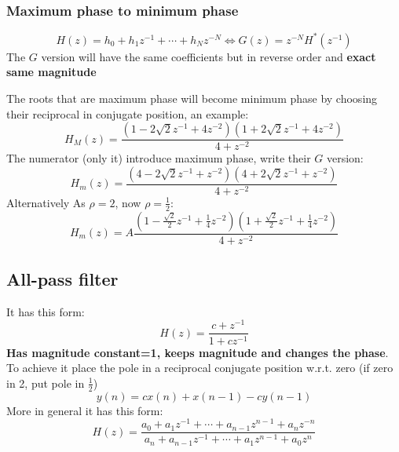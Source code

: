 \subsubsection{Maximum phase to minimum phase}
$$
H(z)=h_0+h_1z^{-1}+\cdots+h_Nz^{-N}\Leftrightarrow G(z)=z^{-N}H^*(z^{-1})
$$
The $G$ version will have the same coefficients but in reverse order and \textbf{exact same magnitude}

The roots that are maximum phase will become minimum phase by choosing their reciprocal in conjugate position, an example:
$$
H_M(z)=\frac{
    \left(
        1-2\sqrt{2}z^{-1}+4z^{-2}
    \right)
    \left(
        1+2\sqrt{2}z^{-1}+4z^{-2}
    \right)
}{4+z^{-2}}
$$
The numerator (only it) introduce maximum phase, write their $G$ version:
$$
H_m(z)=\frac{
    \left(
        4-2\sqrt{2}z^{-1}+z^{-2}
    \right)
    \left(
        4+2\sqrt{2}z^{-1}+z^{-2}
    \right)
}{4+z^{-2}}
$$
Alternatively
As $\rho=2$, now $\rho=\frac{1}{2}$:
$$
H_m(z)=A\frac{
    \left(
        1-\frac{\sqrt{2}}{2}z^{-1}+\frac{1}{4}z^{-2}
    \right)
    \left(
        1+\frac{\sqrt{2}}{2}z^{-1}+\frac{1}{4}z^{-2}
    \right)
}{4+z^{-2}}
$$

\subsection{All-pass filter}
It has this form:
$$
H(z)=\frac{c+z^{-1}}{1+cz^{-1}}
$$
\textbf{Has magnitude constant=1, keeps magnitude and changes the phase}. To achieve it place the pole in a reciprocal conjugate position w.r.t. zero (if zero in 2, put pole in $\frac{1}{2}$)
$$
y(n)=cx(n)+x(n-1)-cy(n-1)
$$
More in general it has this form:
$$
H(z)=\frac{
    a_0+a_1z^{-1}+\cdots+a_{n-1}z^{n-1}+a_nz^{-n}
}{
    a_n+a_{n-1}z^{-1}+\cdots+a_1z^{n-1}+a_0z^n
}
$$